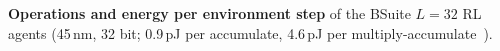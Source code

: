 \begin{table}[t]
  \centering\tabfont
  \setlength{\tabcolsep}{3pt}
  \caption{\textbf{Operations and energy per environment step} of the BSuite $L=32$ RL agents (45\,nm, 32 bit; 0.9\,pJ per accumulate, 4.6\,pJ per multiply-accumulate~\cite{horowitz2014energy}).}
  \label{tab:energy}
  
\end{table}
